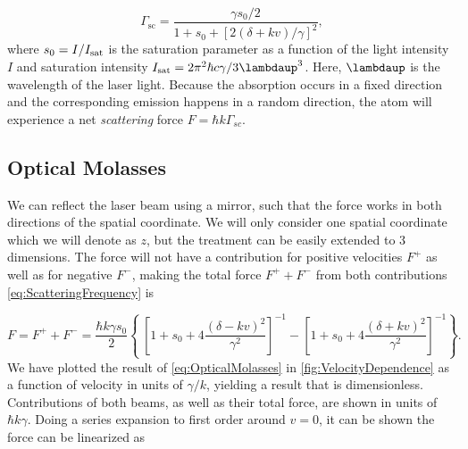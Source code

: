 \begin{equation}\label{eq:ScatteringFrequency}
	\Gamma_{\text{sc}} = \frac{ \gamma s_0 /2}{1+s_0+\left[2(\delta+ k v)/\gamma\right]^2},
\end{equation}
where $s_0 = I/I_{\text{\text{sat}}}$ is the saturation parameter as a function of the light intensity $I$ and saturation intensity $I_{\text{sat}}=2\pi^2 \hbar c \gamma/3\lambdaup^3$. Here, $\lambdaup$ is the wavelength of the laser light.
Because the absorption occurs in a fixed direction and the corresponding emission happens in a random direction, the atom will experience a net \textit{scattering} force $F = \hbar k \Gamma_{sc}$.

\subsection{Optical Molasses}

We can reflect the laser beam using a mirror, such that the force works in both directions of the spatial coordinate.
We will only consider one spatial coordinate which we will denote as $z$, but the treatment can be easily extended to 3 dimensions.
The force will not have a contribution for positive velocities $F^+$ as well as for negative $F^-$, making the total force $F^+ + F^-$ from both contributions \cref{eq:ScatteringFrequency} is \cite{Kowalski2010}

\begin{equation}\label{eq:OpticalMolasses}
	F = F^+ + F^- = \frac{\hbar k \gamma s_0}{2}\left\{\
	\left[1 + s_0 + 4\frac{(\delta - kv)^2}{\gamma^2}\right]^{-1}-
	\left[1 + s_0 + 4\frac{(\delta + kv)^2}{\gamma^2}\right]^{-1}
	\right\}.
\end{equation}
We have plotted the result of \cref{eq:OpticalMolasses} in \cref{fig:VelocityDependence} as a function of velocity in units of $\gamma / k$, yielding a result that is dimensionless. Contributions of both beams, as well as their total force, are shown in units of $\hbar k \gamma$.
Doing a series expansion to first order around $v = 0$, it can be shown the force can be linearized as \cite{Metcalf1999}

